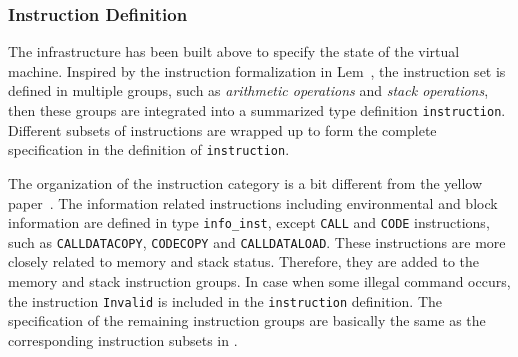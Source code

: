 \documentclass[runningheads]{llncs}
\begin{document}
\subsubsection{Instruction Definition}\label{sec:instruction}

The infrastructure has been built above to specify the state of the virtual machine. 
Inspired by the instruction formalization in Lem~\cite{hirai2017defining}, 
the instruction set is defined in multiple groups, such as {\em arithmetic operations} and {\em stack operations}, then these groups are integrated into a summarized type definition \texttt{instruction}. %
Different subsets of instructions are wrapped up to form the complete specification in the definition of \texttt{instruction}.

The organization of the instruction category is a bit different from the yellow paper~\cite{wood2014ethereum}. 
The information related instructions including environmental and block information are defined in type \texttt{info\_inst}, 
except \texttt{CALL} and \texttt{CODE} instructions, such as \texttt{CALLDATACOPY}, \texttt{CODECOPY} and \texttt{CALLDATALOAD}. 
These instructions are more closely related to memory and stack status. 
Therefore, they are added to the memory and stack instruction groups. %
In case when some illegal command occurs, the instruction \texttt{Invalid} is included in the \texttt{instruction} definition. 
The specification of the remaining instruction groups are basically the same as the corresponding instruction subsets in \cite{wood2014ethereum}. 
\end{document}
